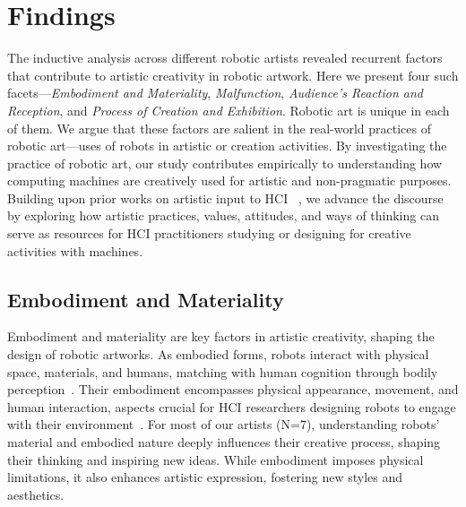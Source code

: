 \section{Findings}

The inductive analysis across different robotic artists revealed recurrent factors that contribute to artistic creativity in robotic artwork. Here we present four such facets---\textit{Embodiment and Materiality}, \textit{Malfunction}, \textit{Audience's Reaction and Reception}, and \textit{Process of Creation and Exhibition}. Robotic art is unique in each of them. We argue that these factors are salient in the real-world practices of robotic art---uses of robots in artistic or creation activities. By investigating the practice of robotic art, our study contributes empirically to understanding how computing machines are creatively used for artistic and non-pragmatic purposes. Building upon prior works on artistic input to HCI ~\cite{kang2022electronicists}, we advance the discourse by exploring how artistic practices, values, attitudes, and ways of thinking can serve as resources for HCI practitioners studying or designing for creative activities with machines.

\subsection{Embodiment and Materiality}
\label{f:emb}
Embodiment and materiality are key factors in artistic creativity, shaping the design of robotic artworks. As embodied forms, robots interact with physical space, materials, and humans, matching with human cognition through bodily perception~\cite{davis2012embodied}. Their embodiment encompasses physical appearance, movement, and human interaction, aspects crucial for HCI researchers designing robots to engage with their environment~\cite{marshall2013introduction}. For most of our artists (N=7), understanding robots' material and embodied nature deeply influences their creative process, shaping their thinking and inspiring new ideas. While embodiment imposes physical limitations, it also enhances artistic expression, fostering new styles and aesthetics.

